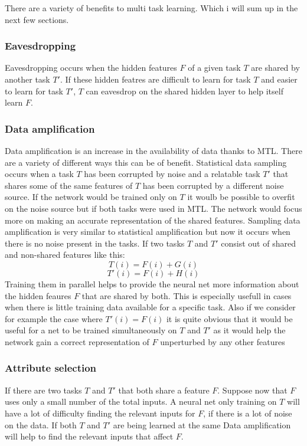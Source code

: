 \documentclass[a4paper]{article}
\begin{document}
There are a variety of benefits to multi task learning. Which i will sum up in the next few sections.

\subsubsection{Eavesdropping}

Eavesdropping occurs when the hidden features $F$ of a given task $T$ are shared by another task $T'$. If these hidden featres are difficult to learn for task $T$ and easier to learn for task $T'$, $T$ can eavesdrop on the shared hidden layer to help itself learn $F$.
\subsubsection{Data amplification}
Data amplification is an increase in the availability of data thanks to MTL. There are a variety of different ways this can be of benefit. Statistical data sampling occurs when a task $T$ has been corrupted by noise and a relatable task $T'$ that shares some of the same features of $T$ has been corrupted by a different noise source. If the network would be trained only on $T$ it woulb be possible to overfit on the noise source but if both tasks were used in MTL. The network would focus more on making an accurate representation of the shared features.
Sampling data amplification is very similar to statistical amplification but now it occurs when there is no noise present in the tasks. If two tasks $T$ and $T'$ consist out of shared and non-shared features like this:
$$T(i)  = F(i) + G(i)$$
$$T'(i) = F(i) + H(i)$$
Training them in parallel helps to provide the neural net more information about the hidden feaures $F$ that are shared by both. This is especially usefull in cases when there is little training data available for a specific task. Also if we consider for example the case where $T'(i) = F(i)$ it is quite obvious that it would be useful for a net to be trained simultaneously on $T$ and $T'$ as it would help the network gain a correct representation of $F$ unperturbed by any other features 
\subsubsection{Attribute selection}
If there are two tasks $T$ and $T'$ that both share a feature $F$. Suppose now that $F$ uses only a small number of the total inputs. A neural net only training on $T$ will have a lot of difficulty finding the relevant inputs for $F$, if there is a lot of noise on the data. If both $T$ and $T'$ are being learned at the same Data amplification will help to find the relevant inputs that affect $F$.
\end{document}
